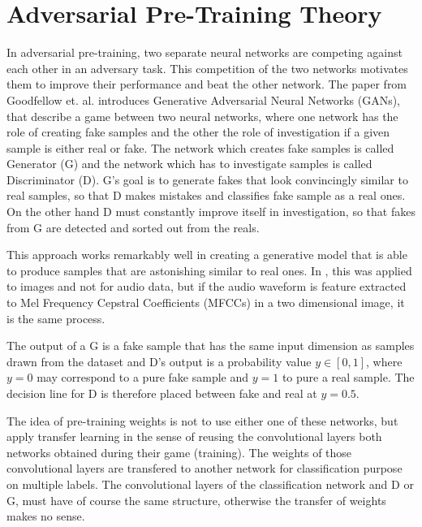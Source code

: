 
\section{Adversarial Pre-Training Theory}\label{sec:nn_adv}
\thesisStateNotReady
In adversarial pre-training, two separate neural networks are competing against each other in an adversary task.
This competition of the two networks motivates them to improve their performance and beat the other network.
The paper from Goodfellow et. al. \cite{Goodfellow2014} introduces Generative Adversarial Neural Networks (GANs), that describe a game between two neural networks, where one network has the role of creating fake samples and the other the role of investigation if a given sample is either real or fake.
The network which creates fake samples is called Generator (G) and the network which has to investigate samples is called Discriminator (D).
G's goal is to generate fakes that look convincingly similar to real samples, so that D makes mistakes and classifies fake sample as a real ones.
On the other hand D must constantly improve itself in investigation, so that fakes from G are detected and sorted out from the reals.

This approach works remarkably well in creating a generative model that is able to produce samples that are astonishing similar to real ones.
In \cite{Goodfellow2014}, this was applied to images and not for audio data, but if the audio waveform is feature extracted to Mel Frequency Cepstral Coefficients (MFCCs) in a two dimensional image, it is the same process.

The output of a G is a fake sample that has the same input dimension as samples drawn from the dataset and D's output is a probability value $y \in [0, 1]$, where $y = 0$ may correspond to a pure fake sample and $y = 1$ to pure a real sample.
The decision line for D is therefore placed between fake and real at $y = 0.5$.

The idea of pre-training weights is not to use either one of these networks, but apply transfer learning in the sense of reusing the convolutional layers both networks obtained during their game (training).
The weights of those convolutional layers are transfered to another network for classification purpose on multiple labels.
The convolutional layers of the classification network and D or G, must have of course the same structure, otherwise the transfer of weights makes no sense.




